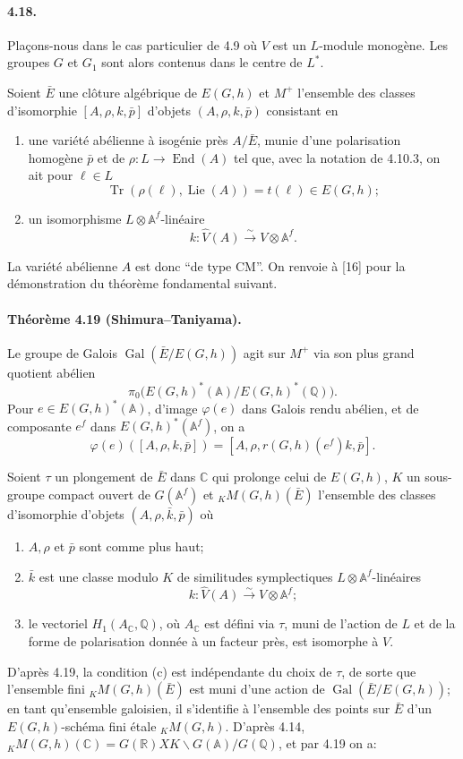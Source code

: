 \documentclass[10pt]{article}
\newcommand{\A}{\mathbb A}
\newcommand{\Af}{\mathbb A^f}
\newcommand{\C}{\mathbb C}
\newcommand{\Q}{\mathbb Q}
\newcommand{\R}{\mathbb R}
\newcommand{\Lie}{\operatorname{Lie}}
\newcommand{\Gal}{\operatorname{Gal}}
\newcommand{\End}{\operatorname{End}}
\newcommand{\Tr}{\operatorname{Tr}}
\begin{document}
\paragraph{4.18.} Plaçons-nous dans le cas particulier de 4.9 où $V$ est un $L$-module monogène. Les groupes $G$ et $G_1$ sont alors contenus dans le centre de $L^*$.

Soient $\bar E$ une clôture algébrique de $E(G,h)$ et $M^+$ l'ensemble des classes d'isomorphie $[A,\rho,k,\bar p]$ d'objets $(A,\rho,k,\bar p)$ consistant en
\begin{enumerate}[label=(\alph*)]
\item une variété abélienne à isogénie près $A/\bar E$, munie d'une polarisation homogène $\bar p$ et de $\rho:L\to\End(A)$ tel que, avec la notation de 4.10.3, on ait pour $\ell\in L$
\[
\Tr(\rho(\ell),\Lie(A))=t(\ell)\in E(G,h);
\]
\item un isomorphisme $L\otimes\Af$-linéaire
\[
k:\widehat V(A)\xrightarrow{\sim}V\otimes\Af.
\]
\end{enumerate}
La variété abélienne $A$ est donc ``de type CM''. On renvoie à [16] pour la démonstration du théorème fondamental suivant.

\paragraph{Théorème 4.19 (Shimura--Taniyama).} Le groupe de Galois $\Gal(\bar E/E(G,h))$ agit sur $M^+$ via son plus grand quotient abélien
\[
\pi_0\bigl(E(G,h)^*(\A)/E(G,h)^*(\Q)\bigr).
\]
Pour $e\in E(G,h)^*(\A)$, d'image $\varphi(e)$ dans Galois rendu abélien, et de composante $e^f$ dans $E(G,h)^*(\Af)$, on a
\[
\tag{4.19.1}
\varphi(e)([A,\rho,k,\bar p])=[A,\rho,r(G,h)(e^f)k,\bar p].
\]

Soient $\tau$ un plongement de $\bar E$ dans $\C$ qui prolonge celui de $E(G,h)$, $K$ un sous-groupe compact ouvert de $G(\Af)$ et ${}_K M(G,h)(\bar E)$ l'ensemble des classes d'isomorphie d'objets $(A,\rho,\bar k,\bar p)$ où
\begin{enumerate}[label=(\alph*)]
\item $A,\rho$ et $\bar p$ sont comme plus haut;
\item $\bar k$ est une classe modulo $K$ de similitudes symplectiques $L\otimes\Af$-linéaires
\[
k:\widehat V(A)\xrightarrow{\sim}V\otimes\Af;
\]
\item le vectoriel $H_1(A_\C,\Q)$, où $A_\C$ est défini via $\tau$, muni de l'action de $L$ et de la forme de polarisation donnée à un facteur près, est isomorphe à $V$.
\end{enumerate}
D'après 4.19, la condition (c) est indépendante du choix de $\tau$, de sorte que l'ensemble fini ${}_K M(G,h)(\bar E)$ est muni d'une action de $\Gal(\bar E/E(G,h))$; en tant qu'ensemble galoisien, il s'identifie à l'ensemble des points sur $\bar E$ d'un $E(G,h)$-schéma fini étale ${}_K M(G,h)$. D'après 4.14, ${}_K M(G,h)(\C)=G(\R)XK\backslash G(\A)/G(\Q)$, et par 4.19 on a:
\end{document}
